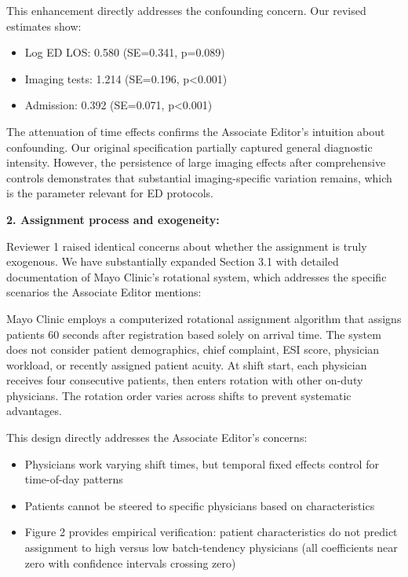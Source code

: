 \documentclass[11pt]{article}
\newcommand{\1}{\hbox{\rm 1\kern-.35em 1}}
\begin{document}
This enhancement directly addresses the confounding concern. Our revised estimates show:

\begin{itemize}
\item Log ED LOS: 0.580 (SE=0.341, p=0.089)
\item Imaging tests: 1.214 (SE=0.196, p<0.001)
\item Admission: 0.392 (SE=0.071, p<0.001)
\end{itemize}

The attenuation of time effects confirms the Associate Editor's intuition about confounding. Our original specification partially captured general diagnostic intensity. However, the persistence of large imaging effects after comprehensive controls demonstrates that substantial imaging-specific variation remains, which is the parameter relevant for ED protocols.

\textbf{2. Assignment process and exogeneity:}

Reviewer 1 raised identical concerns about whether the assignment is truly exogenous. We have substantially expanded Section 3.1 with detailed documentation of Mayo Clinic's rotational system, which addresses the specific scenarios the Associate Editor mentions:

Mayo Clinic employs a computerized rotational assignment algorithm that assigns patients 60 seconds after registration based solely on arrival time. The system does not consider patient demographics, chief complaint, ESI score, physician workload, or recently assigned patient acuity. At shift start, each physician receives four consecutive patients, then enters rotation with other on-duty physicians. The rotation order varies across shifts to prevent systematic advantages.

This design directly addresses the Associate Editor's concerns:

\begin{itemize}
\item Physicians work varying shift times, but temporal fixed effects control for time-of-day patterns
\item Patients cannot be steered to specific physicians based on characteristics
\item Figure 2 provides empirical verification: patient characteristics do not predict assignment to high versus low batch-tendency physicians (all coefficients near zero with confidence intervals crossing zero)
\end{itemize}
\end{document}
